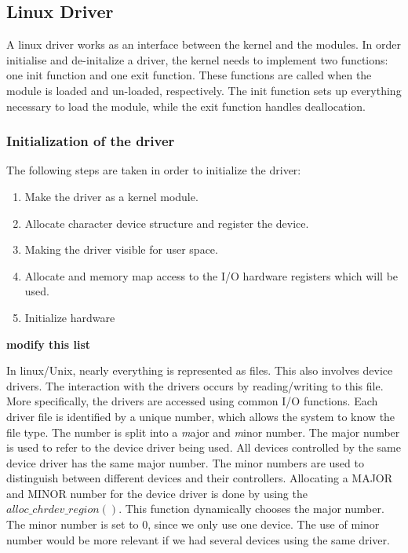 \subsection{Linux Driver}
A linux driver works as an interface between the kernel and the modules. In order initialise and de-initalize a driver, the kernel needs to implement two functions: one init function and one exit function. These functions are called when the module is loaded and un-loaded, respectively. The init function sets up everything necessary to load the module, while the exit function handles deallocation. 


\subsubsection{Initialization of the driver}

The following steps are taken in order to initialize the driver:

\begin{enumerate}
    \item Make the driver as a kernel module.
    \item Allocate character device structure and register the device. 
    \item Making the driver visible for user space.
    \item Allocate and memory map access to the I/O hardware registers which will be used. 
    \item Initialize hardware
\end{enumerate}

{\bf modify this list}

In linux/Unix, nearly everything is represented as files. This also involves device drivers. The interaction with the drivers occurs by reading/writing to this file. More specifically, the drivers are accessed using common I/O functions. Each driver file is identified by a unique number, which allows the system to know the file type. The number is split into a \emph major and \emph minor number. The major number is used to refer to the device driver being used. All devices controlled by the same device driver has the same major number. The minor numbers are used to distinguish between different devices and their controllers. Allocating a MAJOR and MINOR number for the device driver is done by using the $alloc\_chrdev\_region()$. This function dynamically chooses the major number. The minor number is set to 0, since we only use one device. The use of minor number would be more relevant if we had several devices using the same driver. 

